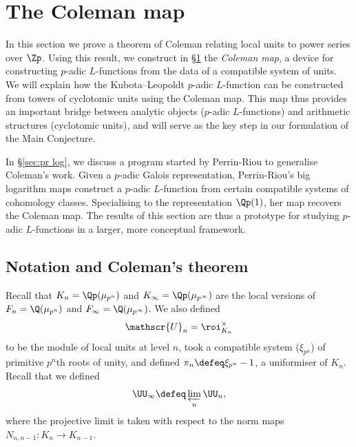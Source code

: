 \documentclass[a4paper,10pt, english, reqno]{smfart}
\numberwithin{equation}{section}
\begin{document}


\section{The Coleman map}\label{sec:coleman map}


In this section we prove a theorem of Coleman relating local units to power series over $\Zp$. Using this result, we construct in \S\ref{sec:coleman map} the \emph{Coleman map}, a device for constructing $p$-adic $L$-functions from the data of a compatible system of units. We will explain how the Kubota--Leopoldt $p$-adic $L$-function can be constructed from towers of cyclotomic units using the Coleman map. This map thus provides an important bridge between analytic objects ($p$-adic $L$-functions) and arithmetic structures (cyclotomic units), and will serve as the key step in our formulation of the Main Conjecture.

In \S\ref{sec:pr log}, we discuss a program started by Perrin-Riou to generalise Coleman's work. Given a $p$-adic Galois representation, Perrin-Riou's big logarithm maps construct a $p$-adic $L$-function from certain compatible systems of cohomology classes. Specialising to the representation $\Qp(1)$, her map recovers the Coleman map. The results of this section are thus a prototype for studying $p$-adic $L$-functions in a larger, more conceptual framework. 


\subsection{Notation and Coleman's theorem}\label{sec:notation coleman}
Recall that $K_n = \Qp(\mu_{p^n})$ and $K_\infty = \Qp(\mu_{p^\infty})$ are the local versions of $F_n = \Q(\mu_{p^n})$ and $F_\infty = \Q(\mu_{p^\infty})$. We also defined
\[\mathscr{U}_n = \roi_{K_n}^\times\]
to be the module of local units at level $n$, took a compatible system ($\xi_{p^n}$) of primitive $p^n$th roots of unity, and defined $\pi_n \defeq \xi_{p^n}-1$, a uniformiser of $K_n$. Recall that we defined
\[\UU_\infty \defeq \varprojlim_n \UU_n,\]
where the projective limit is taken with respect to the norm maps $N_{n,n-1} : K_n \rightarrow K_{n-1}$.
\end{document}
